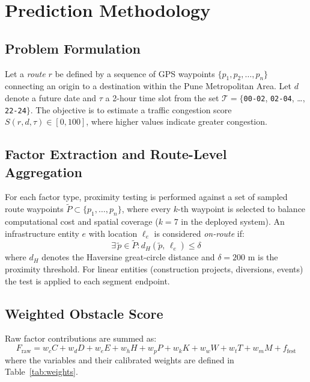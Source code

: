 \documentclass[conference]{IEEEtran}
\begin{document}
\section{Prediction Methodology}
\label{sec:methodology}

\subsection{Problem Formulation}

Let a \textit{route} $r$ be defined by a sequence of GPS waypoints $\{p_1, p_2, \ldots, p_n\}$ connecting an origin to a destination within the Pune Metropolitan Area. Let $d$ denote a future date and $\tau$ a 2-hour time slot from the set $\mathcal{T} = \{$\texttt{00-02}, \texttt{02-04}, \ldots, \texttt{22-24}$\}$. The objective is to estimate a traffic congestion score $S(r, d, \tau) \in [0, 100]$, where higher values indicate greater congestion.

\subsection{Factor Extraction and Route-Level Aggregation}

For each factor type, proximity testing is performed against a set of sampled route waypoints $\tilde{P} \subset \{p_1, \ldots, p_n\}$, where every $k$-th waypoint is selected to balance computational cost and spatial coverage ($k = 7$ in the deployed system). An infrastructure entity $e$ with location $\ell_e$ is considered \textit{on-route} if:
\begin{equation}
\exists\, \tilde{p} \in \tilde{P} : d_H(\tilde{p},\, \ell_e) \leq \delta
\label{eq:proximity}
\end{equation}
where $d_H$ denotes the Haversine great-circle distance and $\delta = 200$ m is the proximity threshold. For linear entities (construction projects, diversions, events) the test is applied to each segment endpoint.

\subsection{Weighted Obstacle Score}

Raw factor contributions are summed as:
\begin{equation}
F_{\text{raw}} = w_c C + w_d D + w_e E + w_h H + w_p P + w_k K + w_w W + w_t T + w_m M + f_{\text{fest}}
\label{eq:raw}
\end{equation}
where the variables and their calibrated weights are defined in Table~\ref{tab:weights}.
\end{document}
